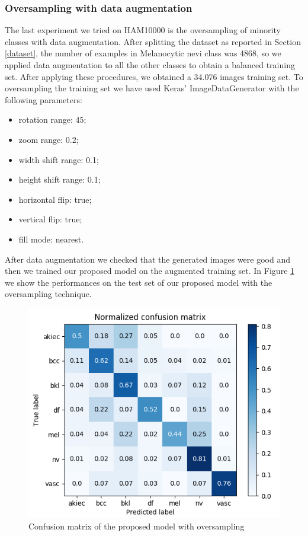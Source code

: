 	\subsubsection{Oversampling with data augmentation}
	
		The last experiment we tried on HAM10000 is the oversampling of minority classes with data augmentation. After splitting the dataset as reported in Section \ref{dataset}, the number of examples in Melanocytic nevi class was 4868, so we applied data augmentation to all the other classes to obtain a balanced training set. After applying these procedures, we obtained a 34.076 images training set.
		To oversampling the training set we have used Keras' ImageDataGenerator with the following parameters:
		\begin{itemize}
			\item rotation range: 45; 
			\item zoom range: 0.2; 
			\item width shift range: 0.1;
			\item height shift range: 0.1;
			\item horizontal flip: true; 
			\item vertical flip: true;
			\item fill mode: nearest.
		\end{itemize}
		
		After data augmentation we checked that the generated images were good and then we trained our proposed model on the augmented training set.
		In Figure \ref{fig:third-matrix} we show the performances on the test set of our proposed model with the oversampling technique.
		
		\begin{figure}[H]
			\centering
			\includegraphics[width=13cm]{images/thirdMatrix.png}
			\caption{Confusion matrix of the proposed model with oversampling}
			\label{fig:third-matrix}
		\end{figure}
		
